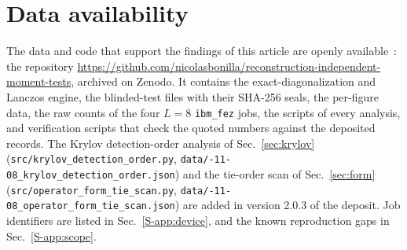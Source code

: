 \documentclass[aps,prb,reprint,onecolumn,12pt,superscriptaddress,longbibliography,floatfix]{revtex4-2}
\begin{document}
\section*{Data availability}
The data and code that support the findings of this article are openly available~\cite{P3zenodo}: the repository \url{https://github.com/nicolasbonilla/reconstruction-independent-moment-tests}, archived on Zenodo. It contains the exact-diagonalization and Lanczos engine, the blinded-test files with their SHA-256 seals, the per-figure data, the raw counts of the four $L=8$ \texttt{ibm\_fez} jobs, the scripts of every analysis, and verification scripts that check the quoted numbers against the deposited records. The Krylov detection-order analysis of Sec.~\ref{sec:krylov} (\texttt{src/\allowbreak krylov\_\allowbreak detection\_\allowbreak order.py}, \texttt{data/-11-08\_\allowbreak krylov\_\allowbreak detection\_\allowbreak order.json}) and the tie-order scan of Sec.~\ref{sec:form} (\texttt{src/\allowbreak operator\_\allowbreak form\_\allowbreak tie\_\allowbreak scan.py}, \texttt{data/-11-08\_\allowbreak operator\_\allowbreak form\_\allowbreak tie\_\allowbreak scan.json}) are added in version 2.0.3 of the deposit. Job identifiers are listed in Sec.~\ref{S-app:device}, and the known reproduction gaps in Sec.~\ref{S-app:scope}.


\end{document}
